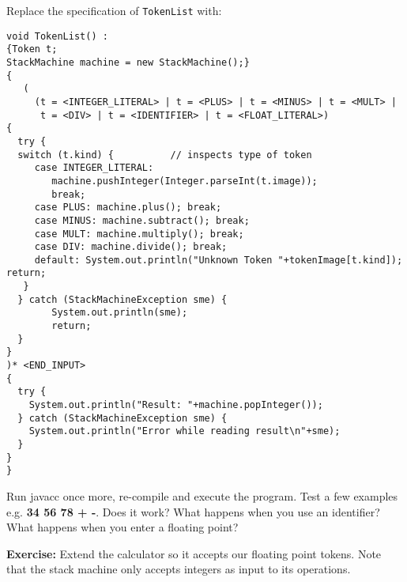 \documentclass{article}
\begin{document}
Replace the specification of \verb+TokenList+ with:
\begin{verbatim}
void TokenList() :
{Token t;
StackMachine machine = new StackMachine();}
{
   (
     (t = <INTEGER_LITERAL> | t = <PLUS> | t = <MINUS> | t = <MULT> |
      t = <DIV> | t = <IDENTIFIER> | t = <FLOAT_LITERAL>)
{ 
  try {
  switch (t.kind) {          // inspects type of token
     case INTEGER_LITERAL: 
        machine.pushInteger(Integer.parseInt(t.image));
        break;
     case PLUS: machine.plus(); break;
     case MINUS: machine.subtract(); break;
     case MULT: machine.multiply(); break;
     case DIV: machine.divide(); break;
     default: System.out.println("Unknown Token "+tokenImage[t.kind]); return;
   }
  } catch (StackMachineException sme) {
    	System.out.println(sme);
        return;
  }
}
)* <END_INPUT>
{
  try {
    System.out.println("Result: "+machine.popInteger());
  } catch (StackMachineException sme) {
    System.out.println("Error while reading result\n"+sme);
  }
}
}
\end{verbatim}

Run javacc once more, re-compile and execute the program. Test a few examples e.g. \textbf{34 56 78 + -}. Does it work? What happens when you use an identifier? What happens when you enter a floating point?

\textbf{Exercise:} Extend the calculator so it accepts our floating point tokens. Note that the stack machine only accepts integers as input to its operations.
\end{document}
